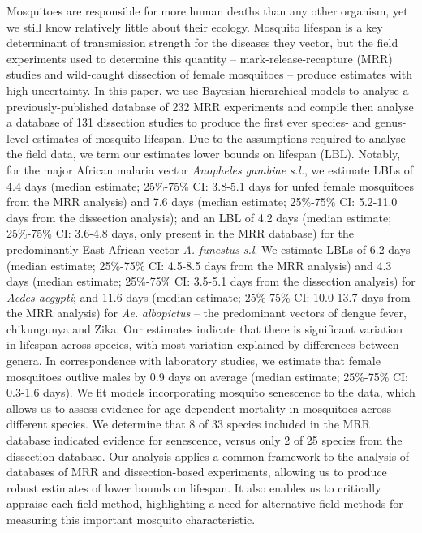 \documentclass[]{article}
\begin{document}
Mosquitoes are responsible for more human deaths than any other
organism, yet we still know relatively little about their ecology.
Mosquito lifespan is a key determinant of transmission strength for the
diseases they vector, but the field experiments used to determine this
quantity -- mark-release-recapture (MRR) studies and wild-caught
dissection of female mosquitoes -- produce estimates with high
uncertainty. In this paper, we use Bayesian hierarchical models to
analyse a previously-published database of 232 MRR experiments and
compile then analyse a database of 131 dissection studies to produce the
first ever species- and genus-level estimates of mosquito lifespan. Due
to the assumptions required to analyse the field data, we term our
estimates lower bounds on lifespan (LBL). Notably, for the major African
malaria vector \emph{Anopheles gambiae s.l.}, we estimate LBLs of 4.4
days (median estimate; 25\%-75\% CI: 3.8-5.1 days for unfed female
mosquitoes from the MRR analysis) and 7.6 days (median estimate;
25\%-75\% CI: 5.2-11.0 days from the dissection analysis); and an LBL of
4.2 days (median estimate; 25\%-75\%
CI: 3.6-4.8 days, only present in the MRR database) for the
predominantly East-African vector \emph{A. funestus s.l}. We estimate
LBLs of 6.2 days (median estimate; 25\%-75\% CI: 4.5-8.5 days from the
MRR analysis) and 4.3 days (median estimate; 25\%-75\% CI: 3.5-5.1 days
from the dissection analysis) for \emph{Aedes aegypti}; and 11.6 days
(median estimate; 25\%-75\% CI: 10.0-13.7 days from the MRR analysis)
for \emph{Ae.} \emph{albopictus} -- the predominant vectors of dengue
fever, chikungunya and Zika. Our estimates indicate that there is
significant variation in lifespan across species, with most variation
explained by differences between genera. In correspondence with
laboratory studies, we estimate that female mosquitoes outlive males by
0.9 days on average (median estimate; 25\%-75\% CI: 0.3-1.6 days). We
fit models incorporating mosquito senescence to the data, which allows
us to assess evidence for age-dependent mortality in mosquitoes across
different species. We determine that 8 of 33 species included in the MRR
database indicated evidence for senescence, versus only 2 of 25 species
from the dissection database. Our analysis applies a common framework to
the analysis of databases of MRR and dissection-based experiments,
allowing us to produce robust estimates of lower bounds on lifespan. It
also enables us to critically appraise each field method, highlighting a need for alternative field methods for measuring this
important mosquito characteristic.
\end{document}
